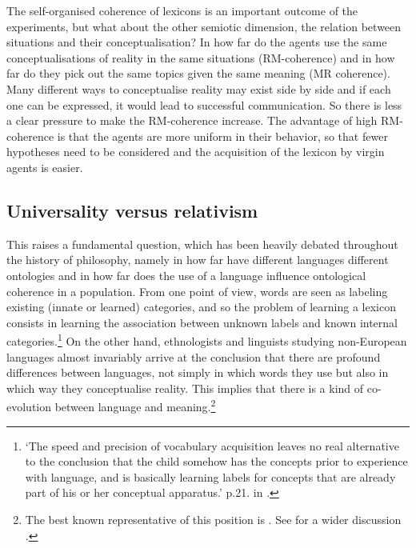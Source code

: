 The self-organised coherence of lexicons is an important
outcome of the experiments, but what about the other
semiotic dimension, the relation
between situations and their conceptualisation? 
In how far do the agents use the same 
conceptualisations of reality in the same situations
(RM-coherence) and in how far do they pick out the same topics
given the same meaning (MR coherence). Many different ways
to conceptualise reality may exist side by side and if
each one can be expressed, it would lead to successful
communication. So there is 
less a clear pressure to make the RM-coherence increase. 
The advantage of high RM-coherence is that the agents 
are more uniform in their behavior, so that fewer 
hypotheses need to be considered and the acquisition of 
the lexicon by virgin agents is easier. 

\subsection{Universality versus relativism}

This raises a fundamental question, which has been
heavily debated throughout the history of 
philosophy, namely in how far have different languages
different ontologies and in how far does the use of a 
language influence ontological coherence in 
a population. From one point of view, words are seen as labeling 
existing (innate or learned) categories, and so the problem
of learning a lexicon consists in learning 
the association between unknown labels and 
known internal categories.\footnote{
`The speed and precision of vocabulary acquisition 
leaves no real alternative to the conclusion that the 
child somehow has the concepts prior to 
experience with language, and is basically learning 
labels for concepts that are already part of his or 
her conceptual apparatus.' p.21. in \cite{Chomsky:1987}.}
On the other hand, ethnologists and linguists studying 
non-European languages almost invariably arrive at the 
conclusion that there are profound differences between 
languages, not simply in which words they use but also 
in which way they conceptualise reality. This implies
that there is a kind of co-evolution between language
and meaning.\footnote{The best known representative of 
this position is \cite{Whorf:1956}. 
See for a wider discussion \cite{Lee:1996}.}

